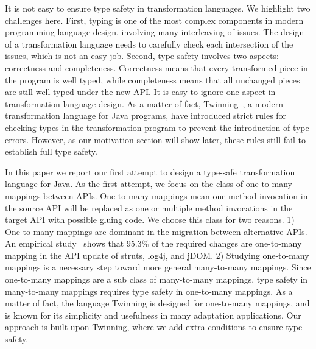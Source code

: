 It is not easy to ensure type safety in transformation languages. We
highlight two challenges here.  First, typing is one of the most
complex components in modern programming language design, involving
many interleaving of issues. The design of a transformation language
needs to carefully check each intersection of the issues, which is
not an easy job. Second, type safety involves two aspects: correctness
and completeness. Correctness means that every transformed piece in
the program is well typed, while completeness means that all unchanged
pieces are still well typed under the new API. It is easy to ignore one
aspect in transformation language design. As a matter of fact,
Twinning~\cite{twinning}, a modern transformation language for Java
programs, have introduced strict rules for checking types in the
transformation program to prevent the introduction of type 
errors. However, as our motivation section will show later, these
rules still fail to establish full type safety.


In this paper we report our first attempt to design a type-safe
transformation language for Java. As the first attempt, we focus on
the class of one-to-many mappings between APIs. One-to-many mappings
mean one method invocation in the source API will be replaced as one
or multiple method invocations in the target API with possible gluing
code. We choose this class for two reasons. 1) One-to-many mappings
are dominant in the migration 
between alternative APIs. An empirical study~\cite{apiupdate}
shows that 95.3\% of the required changes are
one-to-many mapping in the API update of struts, log4j, and jDOM.
2) Studying one-to-many mappings is a necessary step toward more
general many-to-many mappings. Since one-to-many mappings are a sub class
of many-to-many mappings, type safety in many-to-many mappings requires type safety
in one-to-many mappings.
As a matter of fact, the language Twinning is
designed for one-to-many mappings, and is known for its simplicity and
usefulness in many adaptation applications. Our approach is built upon
Twinning, where we add extra conditions to ensure type safety. 

